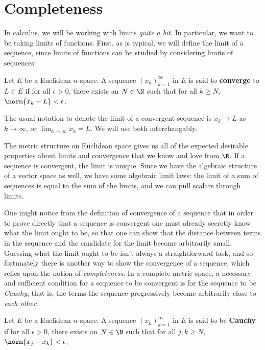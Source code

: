 \section{Completeness}
In calculus, we will be working with limits \emph{quite a bit}. In particular, we want to be taking limits of functions. First, as is typical, we will define the limit of a sequence, since limits of functions can be studied by considering limits of sequences:
\begin{definition}
  Let \( E \) be a Euclidean \( n \)-space. A sequence \( (x_k)_{k=1}^\infty \) in \( E \) is said to \textbf{converge} to \( L\in E \) if for all \( \epsilon>0 \), there exists an \( N\in\N \) such that for all \( k\geq N \), \( \norm{x_k-L}<\epsilon \).
\end{definition}

The usual notation to denote the limit of a convergent sequence is \( x_k\to L \) as \( k\to\infty \), or \( \lim_{k\to\infty}x_k=L \). We will use both interchangably.

\vspace{3mm}

The metric structure on Euclidean space gives us all of the expected desirable properties about limits and convergence that we know and love from \( \R \). If a sequence is convergent, the limit is unique. Since we have the algebraic structure of a vector space as well, we have some algebraic limit laws: the limit of a sum of sequences is equal to the sum of the limits, and we can pull scalars through limits.

\vspace{3mm}

One might notice from the definition of convergence of a sequence that in order to prove directly that a sequence is convergent one must already secretly know what the limit ought to be, so that one can show that the distance between terms in the sequence and the candidate for the limit become arbitrarily small. Guessing what the limit ought to be isn't always a straightforward task, and so fortunately there is another way to show the convergence of a sequence, which relies upon the notion of \emph{completeness}. In a complete metric space, a necessary and sufficient condition for a sequence to be convergent is for the sequence to be \emph{Cauchy}; that is, the terms the sequence progressively become arbitrarily close to \emph{each other}.

\begin{definition}
  Let \( E \) be a Euclidean \( n \)-space. A sequence \( (x_k)_{k=1}^\infty \) in \( E \) is said to be \textbf{Cauchy} if for all \( \epsilon>0 \), there exists an \( N\in\N \) such that for all \( j,k\geq N \), \( \norm{x_j-x_k}<\epsilon \).
\end{definition}

